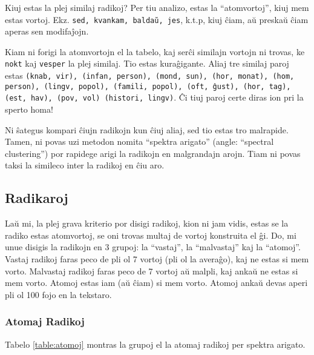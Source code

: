 \documentclass[12pt,twoside]{article}
\begin{document}
Kiuj estas la plej similaj radikoj? Per tiu analizo, estas la ``atomvortoj'', kiuj mem estas vortoj. 
Ekz. \texttt{sed, kvankam, baldaŭ, jes}, k.t.p, kiuj ĉiam, aŭ preskaŭ ĉiam aperas sen modifaĵojn. 

Kiam ni forigi la atomvortojn el la tabelo, kaj serĉi similajn vortojn ni trovas, ke \texttt{nokt}
kaj \texttt{vesper} la plej similaj. Tio estas kuraĝigante. Aliaj tre similaj paroj estas 
\texttt{(knab, vir), (infan, person), (mond, sun), (hor, monat), (hom, person), (lingv, popol), 
(famili, popol), (oft, ĝust), (hor, tag), (est, hav), (pov, vol) (histori, lingv)}. 
Ĉi tiuj paroj certe diras ion pri la sperto homa!

Ni ŝategus kompari ĉiujn radikojn kun ĉiuj aliaj, sed tio estas tro malrapide. Tamen, ni povas uzi 
metodon nomita ``spektra arigato'' (angle: ``spectral clustering'') por rapidege arigi la 
radikojn en malgrandajn arojn. Tiam ni povas taksi la simileco inter la radikoj en ĉiu aro. 

\subsection{Radikaroj}
 
Laŭ mi, la plej grava kriterio por disigi radikoj, kion ni jam vidis, estas se la radiko estas atomvortoj, 
se oni trovas multaj de vortoj konstruita el ĝi. Do, mi unue disigis la radikojn en 3 grupoj: la ``vastaj'',
la ``malvastaj'' kaj la ``atomoj''. Vastaj radikoj faras peco de pli ol 7 vortoj (pli ol la averaĝo), kaj 
ne estas si mem vorto. Malvastaj radikoj faras peco de 7 vortoj aŭ malpli, kaj ankaŭ ne estas si mem vorto.
Atomoj estas iam (aŭ ĉiam) si mem vorto. Atomoj ankaŭ devas aperi pli ol 100 fojo en la tekstaro.

\subsubsection{Atomaj Radikoj}
Tabelo \ref{table:atomoj} montras la grupoj el la atomaj radikoj per spektra arigato. 
\end{document}
